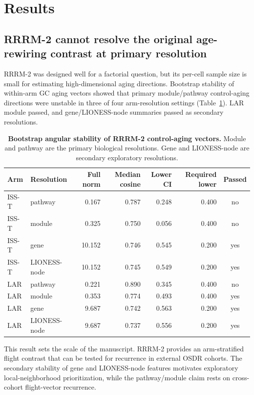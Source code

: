 \documentclass[11pt]{article}
\begin{document}
\clearpage
\tableofcontents
\clearpage
\section{Results}

\subsection{RRRM-2 cannot resolve the original age-rewiring contrast at primary resolution}

RRRM-2 was designed well for a factorial question, but its per-cell sample size is small for estimating high-dimensional aging directions. Bootstrap stability of within-arm GC aging vectors showed that primary module/pathway control-aging directions were unstable in three of four arm-resolution settings (Table~\ref{tab:stability}). LAR module passed, and gene/LIONESS-node summaries passed as secondary resolutions.

\begin{table}[H]
\centering\small
\begin{tabular}{llrrrrc}
\toprule
Arm & Resolution & Full norm & Median cosine & Lower CI & Required lower & Passed \\
\midrule
ISS-T & pathway & 0.167 & 0.787 & 0.248 & 0.400 & no \\
ISS-T & module & 0.325 & 0.750 & 0.056 & 0.400 & no \\
ISS-T & gene & 10.152 & 0.746 & 0.545 & 0.200 & yes \\
ISS-T & LIONESS-node & 10.152 & 0.745 & 0.549 & 0.200 & yes \\
LAR & pathway & 0.221 & 0.890 & 0.345 & 0.400 & no \\
LAR & module & 0.353 & 0.774 & 0.493 & 0.400 & yes \\
LAR & gene & 9.687 & 0.742 & 0.563 & 0.200 & yes \\
LAR & LIONESS-node & 9.687 & 0.737 & 0.556 & 0.200 & yes \\
\bottomrule
\end{tabular}
\caption{\textbf{Bootstrap angular stability of RRRM-2 control-aging vectors.} Module and pathway are the primary biological resolutions. Gene and LIONESS-node are secondary exploratory resolutions.}
\label{tab:stability}
\end{table}

This result sets the scale of the manuscript. RRRM-2 provides an arm-stratified flight contrast that can be tested for recurrence in external OSDR cohorts. The secondary stability of gene and LIONESS-node features motivates exploratory local-neighborhood prioritization, while the pathway/module claim rests on cross-cohort flight-vector recurrence.
\end{document}

